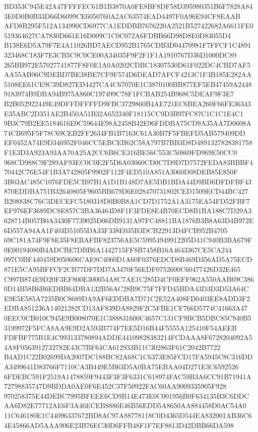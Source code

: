 \documentclass[UTF8,fontset=fandol,zihao=-4,a4paper]{ctexart}
\begin{document}
{{BD353C945E42A47FFFFEC61B1B3870A0FE8BF8DF58D395980351B6F7828A843E0D0B0B33D66D6099CE6050760A2AC63574EAD4497F0A96E94CF8EAAB
AFD8B295F512A134990CD6977CA1EDDBB7676220A2521B527422682A6611FE0519364627CA7830D661E16D009C1C0C072A6FDBB66D98D8E0D83055D4
B138E6D5A79F7E4A11026BD7AECD952B1765CDB3D04470981F7FFCF1C4891323468C183F7E3CB5C9C0CE00A34035F9F2F1F1A1910767D36D1000DC89
265BB972E57027741877F8F0E1A0A0202CDBC18307530D61F022DC4CBD7AF5AA55AB06C9DEBD7BE38BE7CF9F574D6DEAD7AFCF4213C1F3B185E282AA
5108EE61CE9C39D827ED4427CA4C67070E1C3870100BB877EF5EB47459A24489183974B9DBA94B975A860C197499C78F1FCBAB254B968C5DEAF9F3E7
B2B052922449E49DFFDFFFFD9FBC3729860B4AE721EC6BEA260F66FE36343E35ABC2D351AE2B450A51B32A652340F18115CC9D3B97FC87C1C1C1E4C1
9B3C79B2EE5184616E0C59644E98A2458B42E96FDDBA75CD9A35AA7D0608A74CB695F5F78C69CEB2FF2634FB1B7163C61A30B7F5FBEFD5AB579409DD
EF0452A74E9D346952F046CC5EBCEB62C58A797B7BB3D8D4891327828381758F1E3D3A923A93AA70A25A2CC6B6CE316BE56C553C50869FD969E50CC0
968CD988C9F289AF93EC0C0E2F5D6A03060CD0C7D9D7D7572FEDA83BBBF470442C76E54F1B3A742805F9902F112F4ED510A851A3060D08DEB85E850F
3B03AC485C1076FDE5CB97B1A1D1B148D7AE5DB1BDA44D9BD6DFDFBF43870EDDBA751B32640805F9605BB679D6E028470731802CED1509ECD44BC427
B208838C76C3DECEFC5180318D0B0B8A1CD7D1752A1A3175EA54FD52FBF7EF976EF3689DC8E857C3BA36464D8F1F3FDE8E4B70ECD8B1BA188C7D29A3
628714B057B0A3430F7739025D06DB9131A97FC48811BA1876B3B8A63D4B972E6D557A94AA1F403D51055DA33F338E035B3DCB22913D4FCB952B4705
69C181A74F9F8E35F8EBAFBF823756AE5C59954949912205D41C940B3BA679F0E00194080B4ADCBE7DBB6A1442715FF8B7458B16A4643367CE5CA244
097C0BF440459D050606CAE8C4060D1A60F0376EDCD8B469D356AD5A75ECD871E5CA95BFFCF2CB77DF7DD7A3470F56EDF0752600C60477426D32E465
C997B874E9D20F3EF800E300054A8C7AE1C285D4CF0EFF962A550AAB69C3860D14B58B6B6EDBB64DBA132B56AC28B9C75F7FFD45BDA43D3D3D53A64C
E9E5E585A7235B0C8689DA9AF6EDDBA7D71C2E52A408FD0403EE8ADD3F2EDBA851236A14021282CD13AF839DA8829F2C5FBE1CF766D5774C41663A47
0EEC0CB010C945E9B008070E1C388831600C4657C131CF9BCB5DBC85C940B53199972F5FCA8AA9E9D2A593B774F7EE5D16B44F5555A125410F54AEEB
FDFBF775B1E4C993133780894ADDE44109828383214FCDAAA8F6728204092A54A8F0563912732782E43C7BF64CA612933B11C302863F61C2042B7722
B4AD1C22B02699DA2007DC188BC82A68C1C6373E85FCD17FA5945C8C316DDA3499641D83766F7110CA3B449E5B63D5A0BA75EBAA04D271E3C6592526
6FDEBC591F2519A1478859F9443F3F3F6331C618974FAC59B3A6CC91B71941A72798835747D9BDDA0AE0F6E452C37F50922FAC60AA9009335905F928
970258375E44DEBC7995BFEEE6CD9B14E473E0C001956B0F634135B3C6DDCAA6D82E77712AE6F3A46ECEB8886E46B56EDD5A8650AA884458D0AC54A0
11C646180E1C44096337672BD8AC97A88778118C0D4365D544EA832001AB36C64E45866AD5AAA906E23B76EC30D6FFB48F1F7EF8813D42DBB66DA598
}}
\end{document}
